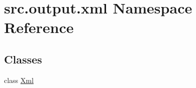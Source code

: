 \hypertarget{namespacesrc_1_1output_1_1xml}{\section{src.\+output.\+xml Namespace Reference}
\label{namespacesrc_1_1output_1_1xml}
}
\subsection*{Classes}
\begin{DoxyCompactItemize}
\item 
class \hyperlink{classsrc_1_1output_1_1xml_1_1_xml}{Xml}
\end{DoxyCompactItemize}
